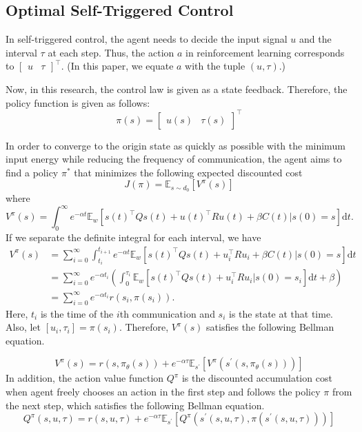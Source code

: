 \documentclass[english, dvipdfmx]{ampmt}             %
\newcommand{\expect}{\mathbb{E}}
\begin{document}
\subsection{Optimal Self-Triggered Control}
\label{sec:formulation}
In self-triggered control, the agent needs to decide the input signal $u$ and the interval $\tau$ at each step. Thus, the action $a$ in reinforcement learning corresponds to $\begin{bmatrix}u & \tau \end{bmatrix}^{\top}$. (In this paper, we equate $a$ with the tuple $(u,\tau)$.) \par
Now, in this research, the control law is given as a state feedback. Therefore, the policy function is given as follows:
\begin{equation}
	\pi(s) = \begin{bmatrix}u(s) & \tau(s)\end{bmatrix}^{\top}
\end{equation}\par
In order to converge to the origin state as quickly as possible with the minimum input energy while reducing the frequency of communication, the agent aims to find a policy $\pi^{*}$ that minimizes the following expected discounted cost 
\begin{equation}
	J(\pi)=\expect_{s\sim d_0}[V^{\pi}(s)] \label{evaluation}
\end{equation}
where
\begin{equation}
	V^{\pi}(s) = \int_{0}^{\infty} e^{-\alpha t}\expect_{w}[s(t)^{\top}Qs(t)+u(t)^{\top}Ru(t)+\beta C(t)|s(0)=s]\textrm{d}t. \label{such_that}
\end{equation}
If we separate the definite integral for each interval, we have 
\begin{align}
	V^{\pi}(s) &= \sum_{i=0}^{\infty}\int_{t_i}^{t_{i+1}} e^{-\alpha t}\expect_{w}[s(t)^{\top}Qs(t)+u_i^{\top}Ru_i+\beta C(t)|s(0)=s]\textrm{d}t \nonumber \\
			 &= \sum_{i=0}^{\infty} e^{-\alpha t_i} (\int_{0}^{\tau_i}\expect_{w}[s(t)^{\top}Qs(t)+u_i^{\top}Ru_i|s(0)=s_i]\textrm{d}t + \beta) \nonumber \\
			 &= \sum_{i=0}^{\infty} e^{-\alpha t_i} r(s_i, \pi(s_i)) \label{self_acc_reward}.
\end{align}
Here, $t_i$ is the time of the $i$th communication and $s_i$ is the state at that time. Also, let $[u_i, \tau_i]=\pi(s_i)$. Therefore, $V^{\pi}(s)$ satisfies the following Bellman equation. \par
\begin{equation}
	V^{\pi}(s) = r(s,\pi_{\theta}(s)) + e^{-\alpha\tau}\expect_{s^{\prime}}[V^{\pi}(s^{\prime}(s,\pi_{\theta}(s)))] \label{bellman}
\end{equation}
In addition, the action value function $Q^{\pi}$ is the discounted accumulation cost when agent freely chooses an action in the first step and follows the policy $\pi$ from the next step, which satisfies the following Bellman equation.
\begin{equation}
	Q^{\pi}(s,u,\tau) = r(s,u,\tau) + e^{-\alpha\tau}\expect_{s^{\prime}}[Q^{\pi}(s^{\prime}(s,u,\tau), \pi(s^{\prime}(s,u,\tau)))] \label{Q_bellman}
\end{equation}
\end{document}
